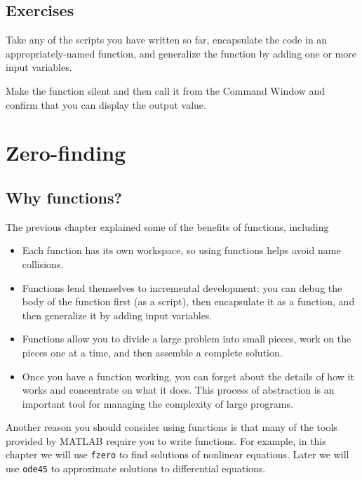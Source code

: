\documentclass{book}
\begin{document}
\section{Exercises}

\begin{ex}
Take any of the scripts you have written so far, encapsulate
the code in an appropriately-named function, and generalize
the function by adding one or more input variables.

Make the function silent and then call it from the Command
Window and confirm that you can display the output value.
\end{ex}



\chapter{Zero-finding}


\section{Why functions?}

The previous chapter explained some of the benefits of functions,
including

\begin{itemize}

\item Each function has its own workspace, so using functions helps
avoid name collisions.

\item Functions lend themselves to incremental development: you can
debug the body of the function first (as a script), then encapsulate
it as a function, and then generalize it by adding input variables.

\item Functions allow you to divide a large problem into small
pieces, work on the pieces one at a time, and then assemble a
complete solution.

\item Once you have a function working, you can forget about the
details of how it works and concentrate on what it does.  This
process of abstraction is an important tool for managing the
complexity of large programs.

\end{itemize}

Another reason you should consider using functions is that many of the
tools provided by MATLAB require you to write functions.  For example,
in this chapter we will use {\tt fzero} to find solutions of nonlinear
equations.  Later we will use {\tt ode45} to approximate solutions to
differential equations.
\end{document}

